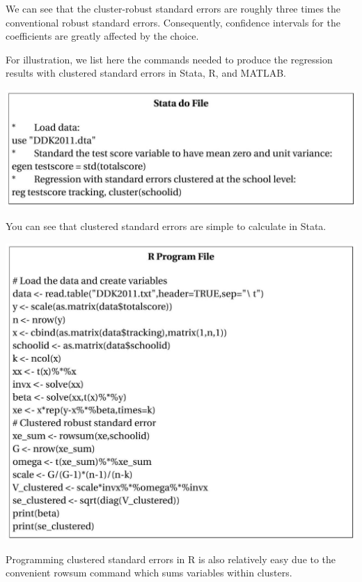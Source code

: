 \documentclass[10pt]{article}
\begin{document}
We can see that the cluster-robust standard errors are roughly three times the conventional robust standard errors. Consequently, confidence intervals for the coefficients are greatly affected by the choice.

For illustration, we list here the commands needed to produce the regression results with clustered standard errors in Stata, R, and MATLAB.

\includegraphics[max width=\textwidth]{2022_09_17_46fafb30295495354ae2g-31(1)}

You can see that clustered standard errors are simple to calculate in Stata.

\includegraphics[max width=\textwidth]{2022_09_17_46fafb30295495354ae2g-32}

Programming clustered standard errors in $\mathrm{R}$ is also relatively easy due to the convenient rowsum command which sums variables within clusters.
\end{document}
